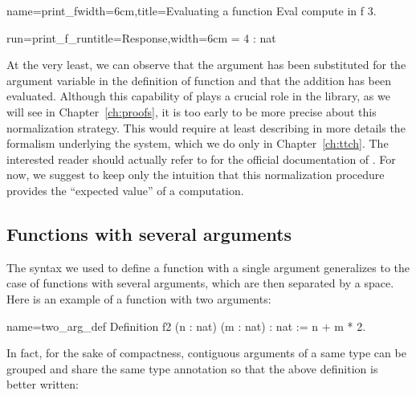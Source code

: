\begin{coq}{name=print_f}{width=6cm,title=Evaluating a function}
Eval compute in f 3.
\end{coq}
\begin{coqout}{run=print_f_run}{title=Response,width=6cm}
 = 4 : nat
\end{coqout}

At the very least, we can observe that the argument  has been
substituted for the argument variable in the definition of function
 and that the addition has been evaluated.
Although this capability of \Coq{} plays a crucial role
in the \mcbMC{} library, as we will see in Chapter~\ref{ch:proofs}, it
is too early to be
more precise about this normalization strategy. This would require
at least describing in more details the formalism underlying the
\Coq{} system, which we do only in Chapter~\ref{ch:ttch}. The
interested reader should actually refer to \cite[Section
8.7.1]{Coq:manual} for the official documentation of .
For now, we suggest to keep only the intuition that this
normalization procedure provides the ``expected value'' of a
computation.


\subsection{Functions with several arguments}
\label{sec:fun-sev-args}
The syntax we used to define a function with a single argument
generalizes to the case of functions with several arguments, which are
then separated by a space. Here is an example of a function with two
arguments:

\begin{coq}{name=two_arg_def}{}
Definition f2 (n : nat) (m : nat) : nat :=
  n + m * 2.
\end{coq}
In fact, for the sake of compactness, contiguous arguments of a same
type can be grouped and share the same type annotation so that the
above definition is better written:

